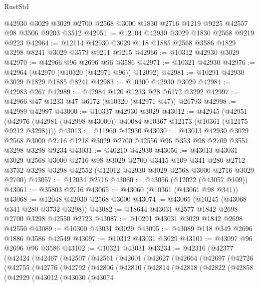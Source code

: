 \begin{lexlean}{RustStd}
\begin{coremodule}
    @42930
    @3029
    @3029
    @2700
    @2568
    @3000
    @1830
    @2716
    @1219
    @9225
    @42557
    @98
    @3506
    @9203
    @3512
@42951 := @12104 @42930 @3029 @1830 @2568 @9219 @9223
@42964 := @12114 @42930 @3029 @118 @1885 @2568 @3586 @1829 @3298 @8241 @3029 @3579 @9211 @9215
@42966 := @10312 @42930 @3029
@42970 := @42966 @96 @2696 @96 @3586
@42971 := @10321 @42930
@42976 := @42964 (@42970 (@10320 (@42971 @96)) @12092)
@42981 := @10291 @42930 @3029 @1829 @1885 @8241
@42983 := @10300 @42930 @3029
@42984 := @42983 @267
@42989 := @42984 @120 @1233 @28 @6172 @3292
@42997 := @42966 @47 @1233 @47 @6172 (@10320 (@42971 @47)) @26793
@42998 := @42989 @42997
@43000 := @10337 @42930 @3029
@43012 := @42945
    (@42951 (@42976 (@42981 (@42998 @43000)) @40084 @10367 @12173 (@10361 (@12175 @9212 @3298))))
@43013 := @11960 @42930
@43030 := @43013
    @42930
    @3029
    @2568
    @3000
    @2716
    @1218
    @3029
    @2700
    @42556
    @96
    @353
    @98
    @2709
    @3551
    @3298
    @3298
    @9234
@43031 := @40210 @42930
@43056 := @43013
    @43031
    @3029
    @2568
    @3000
    @2716
    @98
    @3029
    @2700
    @3415
    @109
    @341
    @280
    @2712
    @3732
    @3298
    @3298
    @42552
    (@12012 @42930 @3029 @2568 @3000 @2716 @3029 @2700)
@43057 := @12034 @2716
@43060 := @43056 (@12022 (@43057 @109))
@43061 := @35803 @2716
@43065 := @43060 (@10361 (@43061 @98 @341))
@43068 := @12048 @42930 @2568 @3000
@43074 := @43065 (@10245 (@43068 @341 @280 @3732 @3298))
@43082 := @18644 @43031 @2577 @1842 @2698 @2700 @3298 @42550 @2723
@43087 := @10291 @43031 @3029 @1842 @2698 @42550
@43089 := @10300 @43031 @3029
@43095 := @43089 @118 @349 @2696 @1886 @3586 @42549
@43097 := @10312 @43031 @3029
@43101 := @43097 @96 @2696 @96 @3586
@43102 := @10321 @43031
@43234 := @42316
    (@42377
      (@42424
        (@42467
          (@42507
            (@42561
              (@42601
                (@42627
                  (@42664
                    (@42697
                      (@42726
                        (@42755
                          (@42776
                            (@42792
                              (@42806
                                (@42810
                                  (@42814
                                    (@42818
                                      (@42822
                                        (@42858
                                          (@42929
                                            (@43012
                                              (@43030
                                                (@43074

\end{coremodule}
\end{lexlean}
